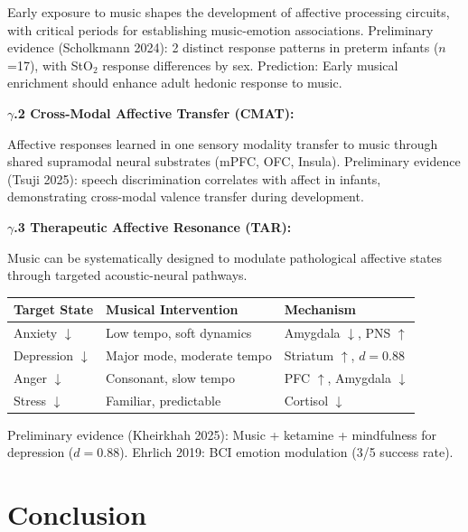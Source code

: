 \documentclass[9pt,onecolumn]{article}
\begin{document}
Early exposure to music shapes the development of affective processing circuits, with critical periods for establishing music-emotion associations. Preliminary evidence (Scholkmann 2024): 2 distinct response patterns in preterm infants ($n$=17), with StO$_2$ response differences by sex. Prediction: Early musical enrichment should enhance adult hedonic response to music.

\textbf{$\gamma$.2 Cross-Modal Affective Transfer (CMAT):}

Affective responses learned in one sensory modality transfer to music through shared supramodal neural substrates (mPFC, OFC, Insula). Preliminary evidence (Tsuji 2025): speech discrimination correlates with affect in infants, demonstrating cross-modal valence transfer during development.

\textbf{$\gamma$.3 Therapeutic Affective Resonance (TAR):}

Music can be systematically designed to modulate pathological affective states through targeted acoustic-neural pathways.

\begin{center}
\small
\begin{tabular}{@{}lll@{}}
\toprule
\textbf{Target State} & \textbf{Musical Intervention} & \textbf{Mechanism} \\
\midrule
Anxiety $\downarrow$ & Low tempo, soft dynamics & Amygdala $\downarrow$, PNS $\uparrow$ \\
Depression $\downarrow$ & Major mode, moderate tempo & Striatum $\uparrow$, $d=0.88$ \\
Anger $\downarrow$ & Consonant, slow tempo & PFC $\uparrow$, Amygdala $\downarrow$ \\
Stress $\downarrow$ & Familiar, predictable & Cortisol $\downarrow$ \\
\bottomrule
\end{tabular}
\end{center}

Preliminary evidence (Kheirkhah 2025): Music + ketamine + mindfulness for depression ($d=0.88$). Ehrlich 2019: BCI emotion modulation (3/5 success rate).



\section{Conclusion}
\end{document}
